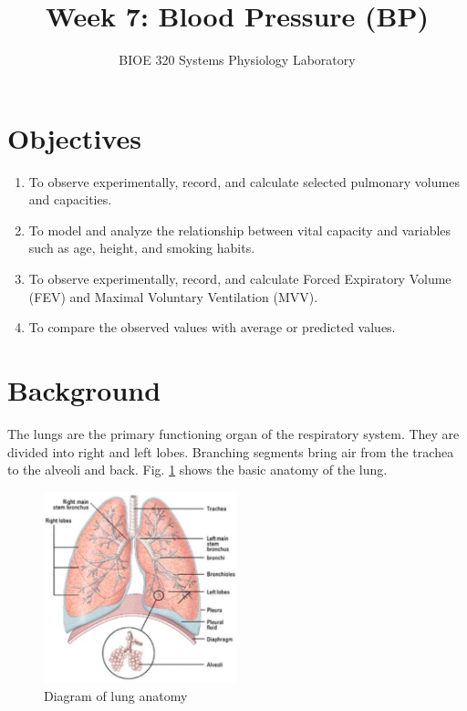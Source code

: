 \documentclass{article}
\title{Week 7: Blood Pressure (BP)}
\author{BIOE 320 Systems Physiology Laboratory}
\date{}
\begin{document}
\large
\maketitle

\section*{Objectives}
\begin{enumerate}
	\item To observe experimentally, record, and calculate selected pulmonary volumes and capacities.
	\item To model and analyze the relationship between vital capacity and variables such as age, height, and smoking habits.
	\item To observe experimentally, record, and calculate Forced Expiratory Volume (FEV) and Maximal Voluntary Ventilation (MVV).
	\item To compare the observed values with average or predicted values.
\end{enumerate}

\section*{Background}

The lungs are the primary functioning organ of the respiratory system. They are divided into right and left lobes. Branching segments bring air from the trachea to the alveoli and back. Fig. \ref{lung} shows the basic anatomy of the lung.

\begin{figure}[h]
\centering\includegraphics[width=0.5\textwidth]{../images/PF_I_1.jpg}
\caption{Diagram of lung anatomy}
\label{lung}
\end{figure}
\end{document}
